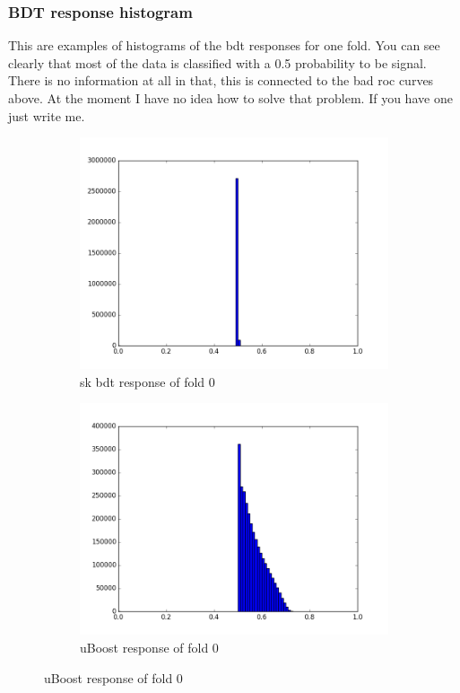 \documentclass{beamer}
\begin{document}
\begin{frame}
  \frametitle{BDT response histogram}
This are examples of histograms of the bdt responses for one fold.
You can see clearly that most of the data is classified with a 0.5 probability to be signal. There is no information at all in that, this is connected to the bad roc curves above. At the moment I have no idea how to solve that problem. If you have one just write me.
    \begin{figure}
    \centering
    \begin{subfigure}{0.5\textwidth}
    \centering
    \includegraphics[width=1\linewidth]{plots/sk_bdtHist_fold0}
    \caption{sk bdt response of fold 0}
    \end{subfigure}%
    \begin{subfigure}{0.5\textwidth}
    \centering
    \includegraphics[width=1\linewidth]{plots/uBoostHist_fold0}
    \caption{uBoost response of fold 0}
    \end{subfigure}
    \end{figure}

\end{frame}


\end{document}
